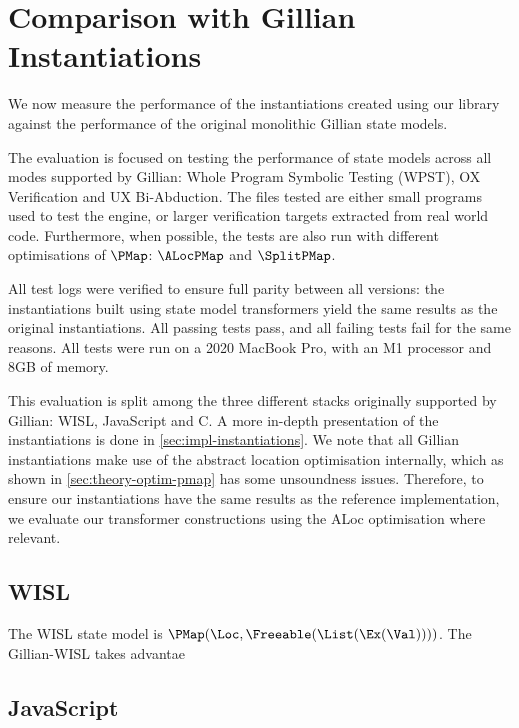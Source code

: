 \section{Comparison with Gillian Instantiations} \label{sec:comparison-gillian}

We now measure the performance of the instantiations created using our library against the performance of the original monolithic Gillian state models.

The evaluation is focused on testing the performance of state models across all modes supported by Gillian: Whole Program Symbolic Testing (WPST), OX Verification and UX Bi-Abduction. The files tested are either small programs used to test the engine, or larger verification targets extracted from real world code. Furthermore, when possible, the tests are also run with different optimisations of $\PMap$: $\ALocPMap$ and $\SplitPMap$.

All test logs were verified to ensure full parity between all versions: the instantiations built using state model transformers yield the same results as the original instantiations. All passing tests pass, and all failing tests fail for the same reasons. All tests were run on a 2020 MacBook Pro, with an M1 processor and 8GB of memory.

This evaluation is split among the three different stacks originally supported by Gillian: WISL, JavaScript and C. A more in-depth presentation of the instantiations is done in \cref{sec:impl-instantiations}. We note that all Gillian instantiations make use of the abstract location optimisation internally, which as shown in \cref{sec:theory-optim-pmap} has some unsoundness issues. Therefore, to ensure our instantiations have the same results as the reference implementation, we evaluate our transformer constructions using the ALoc optimisation where relevant.

\subsection{WISL}

The WISL state model is $\PMap(\Loc, \Freeable(\List(\Ex(\Val))))$. The Gillian-WISL takes advantae 

\subsection{JavaScript}

